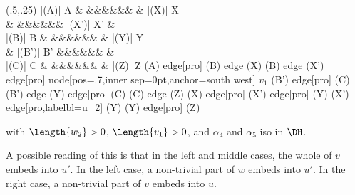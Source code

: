 \documentclass{LMCS}
\theoremstyle{plain}\newtheorem{satz}[thm]{Satz}
\begin{document}
\begin{prop}
\begin{center}
\begin{minipage}[t]{0.35\linewidth}
      \centering \Diag (.5,.25) {     }{|(A)| A \& \&\&\&\&\&\& \& |(X)| X \\
        \&  \&\&\&\&\&\& |(X')| X' \&  \\
        |(B)| B \& \&\&\&\&\&\& \& |(Y)| Y \\
        \& |(B')| B' \&\&\&\&\&\&  \&  \\
        |(C)| C \& \&\&\&\&\&\& \& |(Z)| Z }{(A) edge[pro] (B) edge (X) (B) edge (X') edge[pro] node[pos=.7,inner sep=0pt,anchor=south west]
        {$\scriptstyle v_1$} (B') edge[pro] (C) (B') edge (Y) edge[pro] (C) (C) edge (Z) (X) edge[pro] (X') edge[pro] (Y) (X') edge[pro,labelbl={u_2}] (Y) (Y) edge[pro] (Z) }
    \end{minipage}
  \end{center}
  with $\length{w_2} > 0$, $\length{v_1} > 0$, and $\alpha_4$ and
  $\alpha_5$ iso in $\DH$.
\end{prop}
A possible reading of this is that in the left and middle cases, the
whole of $v$ embeds into $u'$. In the left case, a non-trivial part of
$w$ embeds into $u'$.  In the right case, a
non-trivial part of $v$ embeds into $u$.
\end{document}
